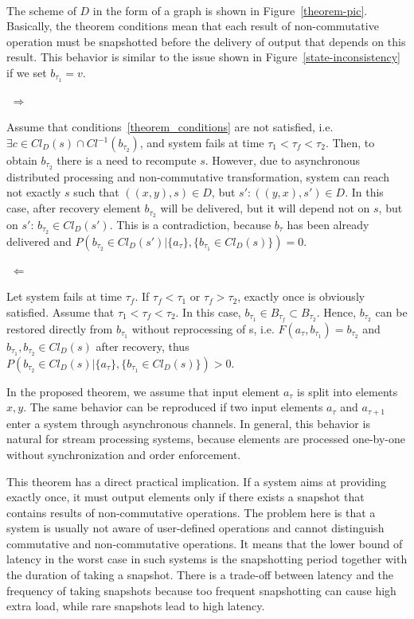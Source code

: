 \begin{sketch}
$ $\newline

The scheme of $D$ in the form of a graph is shown in Figure~\ref{theorem-pic}. Basically, the theorem conditions mean that each result of non-commutative operation must be snapshotted before the delivery of output that depends on this result. This behavior is similar to the issue shown in Figure~\ref{state-inconsistency} if we set $b_{\tau_1}=v$.

$ $\newline
$\Rightarrow$

Assume that conditions~\ref{theorem_conditions} are not satisfied, i.e. $\exists c \in Cl_D(s) \cap Cl^{-1}(b_{\tau_2})$, and system fails at time $\tau_1<\tau_f<\tau_2$. Then, to obtain $b_{\tau_2}$ there is a need to recompute $s$. However, due to asynchronous distributed processing and non-commutative transformation, system can reach not exactly $s$ such that $((x,y), s) \in D$, but $s':((y,x),s')\in D$. In this case, after recovery element $b_{\tau_2}$ will be delivered, but it will depend not on $s$, but on $s'$: $b_{\tau_2}\in Cl_D(s')$. This is a contradiction, because $b_\tau$ has been already delivered and $P(b_{\tau_2}\in Cl_D(s')|\{a_\tau\},\{b_{\tau_1} \in Cl_D(s) \})=0$.

$ $\newline
$\Leftarrow$

Let system fails at time $\tau_f$. If $\tau_f < \tau_1$ or $\tau_f > \tau_2$, exactly once is obviously satisfied. Assume that $\tau_1<\tau_f<\tau_2$. In this case, $b_{\tau_1}\in B_{\tau_f}\subset B_{\tau_2}$. Hence, $b_{\tau_2}$ can be restored directly from $b_{\tau_1}$ without reprocessing of s, i.e. $F(a_\tau,b_{\tau_1})=b_{\tau_2}$ and $b_{\tau_1}, b_{\tau_2} \in Cl_D(s)$ after recovery, thus $P(b_{\tau_2}\in Cl_D(s)|\{a_\tau\},\{b_{\tau_1} \in Cl_D(s) \})>0$.
\end{sketch}

In the proposed theorem, we assume that input element $a_\tau$ is split into elements $x,y$. The same behavior can be reproduced if two input elements $a_\tau$ and $a_{\tau+1}$ enter a system through asynchronous channels. In general, this behavior is natural for stream processing systems, because elements are processed one-by-one without synchronization and order enforcement. 

This theorem has a direct practical implication. If a system aims at providing exactly once, it must output elements only if there exists a snapshot that contains results of non-commutative operations. The problem here is that a system is usually not aware of user-defined operations and cannot distinguish commutative and non-commutative operations. It means that the lower bound of latency in the worst case in such systems is the snapshotting period together with the duration of taking a snapshot. There is a trade-off between latency and the frequency of taking snapshots because too frequent snapshotting can cause high extra load, while rare snapshots lead to high latency.

